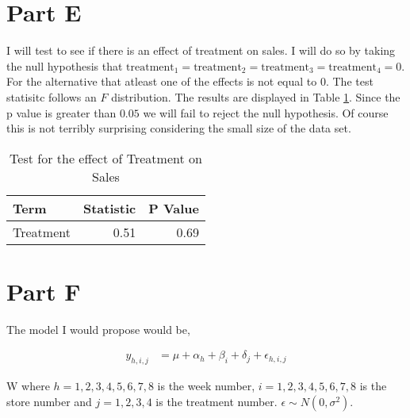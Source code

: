 \documentclass[]{book}
\begin{document}
\hypertarget{part-e-3}{%
\section{Part E}\label{part-e-3}}

I will test to see if there is an effect of treatment on sales. I will do so by taking the null hypothesis that \(\text{treatment}_1 = \text{treatment}_2 = \text{treatment}_3 = \text{treatment}_4 = 0\). For the alternative that atleast one of the effects is not equal to 0. The test statisitc follows an \(F\) distribution. The results are displayed in Table \ref{tab:test-q5}. Since the p value is greater than \(0.05\) we will fail to reject the null hypothesis. Of course this is not terribly surprising considering the small size of the data set.

\begin{table}

\caption{\label{tab:test-q5}Test for the effect of Treatment on Sales}
\centering
\begin{tabular}[t]{lrr}
\toprule
Term & Statistic & P Value\\
\midrule
Treatment & 0.51 & 0.69\\
\bottomrule
\end{tabular}
\end{table}

\hypertarget{part-f-2}{%
\section{Part F}\label{part-f-2}}

The model I would propose would be,

\begin{align}
  y_{h, i, j} &= \mu + \alpha_h + \beta_{i} + \delta_j + \epsilon_{h, i, j}
\end{align}

W
where \(h = 1, 2, 3, 4, 5, 6, 7, 8\) is the week number, \(i = 1, 2, 3, 4, 5, 6, 7, 8\) is the store number and \(j = 1, 2, 3, 4\) is the treatment number. \(\epsilon \sim N(0, \sigma^2)\).


\end{document}
